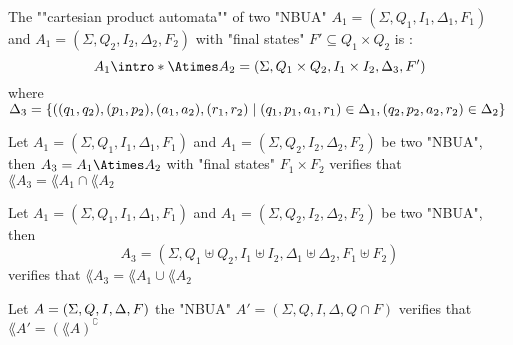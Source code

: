 \documentclass{article}
\begin{document}
\begin{definition}
	The ""cartesian product automata"" of two "NBUA" $A_1 = (\Sigma, Q_1, I_1, \Delta_1, F_1)$ and $A_1 = (\Sigma, Q_2, I_2, \Delta_2, F_2)$ with "final states" $F' \subseteq Q_1 \times Q_2$ is :
	\[ A_1 \intro* \Atimes A_2 = (\Sigma, Q_1 \times Q_2, I_1 \times I_2, \Delta_3 , F') \]
	where $\Delta_3 = \left\{((q_1,q_2) , (p_1,p_2), (a_1,a_2), (r_1,r_2) \mid  (q_1,p_1,a_1,r_1) \in \Delta_1, (q_2,p_2,a_2,r_2) \in \Delta_2\right\}$
\end{definition}

\begin{lemma}
	Let $A_1 = (\Sigma, Q_1, I_1, \Delta_1, F_1)$ and $A_1 = (\Sigma, Q_2, I_2, \Delta_2, F_2)$ be two "NBUA", then $A_3 = A_1 \Atimes A_2$ with "final states" $F_1 \times F_2$
	verifies that $\lang {A_3} = \lang {A_1} \cap \lang {A_2}$
\end{lemma}

\begin{lemma}
	Let $A_1 = (\Sigma, Q_1, I_1, \Delta_1, F_1)$ and $A_1 = (\Sigma, Q_2, I_2, \Delta_2, F_2)$ be two "NBUA", then
	\[ A_3 = (\Sigma, Q_1 \uplus Q_2, I_1 \uplus I_2, \Delta_1 \uplus \Delta_2, F_1 \uplus F_2) \]
	verifies that $\lang {A_3} = \lang {A_1} \cup \lang {A_2}$
\end{lemma}

\begin{lemma}
	Let $A = (\Sigma, Q, I, \Delta, F)$ the "NBUA" $A' = (\Sigma, Q, I, \Delta, Q \cap F)$
	verifies that $\lang {A'} = (\lang A )^{\complement}$
\end{lemma}
\end{document}
